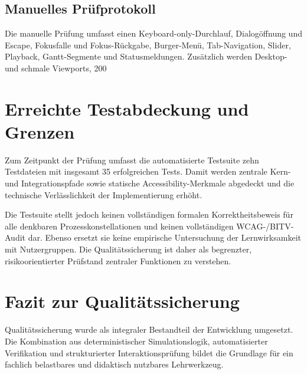 \subsection{Manuelles Prüfprotokoll}

Die manuelle Prüfung umfasst einen Keyboard-only-Durchlauf, Dialogöffnung und Escape, Fokusfalle und Fokus-Rückgabe, Burger-Menü, Tab-Navigation, Slider, Playback, Gantt-Segmente und Statusmeldungen. Zusätzlich werden Desktop- und schmale Viewports, 200\,%

\section{Erreichte Testabdeckung und Grenzen}

Zum Zeitpunkt der Prüfung umfasst die automatisierte Testsuite zehn Testdateien mit insgesamt 35 erfolgreichen Tests. Damit werden zentrale Kern- und Integrationspfade sowie statische Accessibility-Merkmale abgedeckt und die technische Verlässlichkeit der Implementierung erhöht.

Die Testsuite stellt jedoch keinen vollständigen formalen Korrektheitsbeweis für alle denkbaren Prozesskonstellationen und keinen vollständigen WCAG-/BITV-Audit dar. Ebenso ersetzt sie keine empirische Untersuchung der Lernwirksamkeit mit Nutzergruppen. Die Qualitätssicherung ist daher als begrenzter, risikoorientierter Prüfstand zentraler Funktionen zu verstehen.

\section{Fazit zur Qualitätssicherung}

Qualitätssicherung wurde als integraler Bestandteil der Entwicklung umgesetzt. Die Kombination aus deterministischer Simulationslogik, automatisierter Verifikation und strukturierter Interaktionsprüfung bildet die Grundlage für ein fachlich belastbares und didaktisch nutzbares Lehrwerkzeug.
